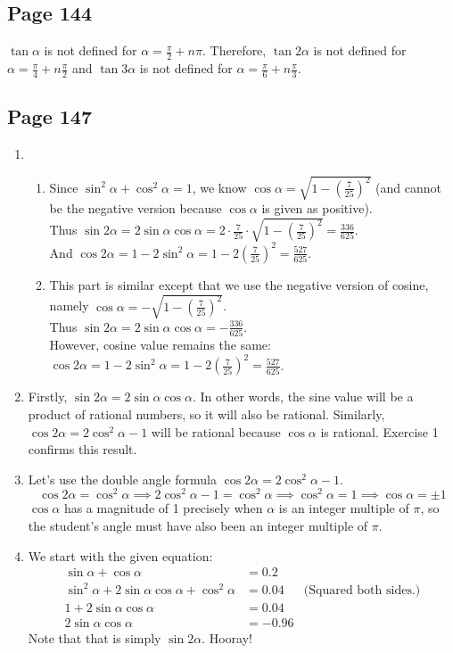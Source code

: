\documentclass{article}
\newenvironment{solutions}[1]
{\subsection*{#1}
 \begin{enumerate}[leftmargin=1.5em]}
{\end{enumerate}}
\newcommand{\solution}{\item}
\newenvironment{subsolutions}
{\begin{enumerate}}
{\end{enumerate}}
\begin{document}
\begin{solutions}{Page 144}
$\tan{\alpha}$ is not defined for $\alpha = \tfrac{\pi}{2} + n\pi$. Therefore, $\tan{2\alpha}$ is not defined for $\alpha = \tfrac{\pi}{4} + n\tfrac{\pi}{2}$ and $\tan{3\alpha}$ is not defined for $\alpha = \tfrac{\pi}{6} + n\tfrac{\pi}{3}$.
\end{solutions}

\begin{solutions}{Page 147}
\solution %
    \begin{subsolutions}
        \solution %
        Since $\sin^2 \alpha + \cos^2\alpha = 1$, we know $\cos\alpha = \sqrt{1-(\frac{7}{25})^2}$ (and cannot be the negative version because $\cos \alpha$ is given as positive).\\
        Thus $\sin 2\alpha = 2\sin\alpha \cos \alpha = 2\cdot \frac{7}{25}\cdot\sqrt{1-(\frac{7}{25})^2}=\frac{336}{625}$.\\
        And $\cos2\alpha =1-2\sin^2\alpha = 1-2(\frac{7}{25})^2=\frac{527}{625}$.
        \solution %
        This part is similar except that we use the negative version of cosine, namely $\cos\alpha=-\sqrt{1-(\frac{7}{25})^2}$.\\
        Thus $\sin 2\alpha = 2\sin\alpha \cos \alpha = -\frac{336}{625}$.\\
        However, cosine value remains the same: $\cos2\alpha =1-2\sin^2\alpha = 1-2(\frac{7}{25})^2=\frac{527}{625}$.
    \end{subsolutions}

\solution %
Firstly, $\sin 2\alpha=2\sin\alpha\cos\alpha$. In other words, the sine value will be a product of rational numbers, so it will also be rational. Similarly, $\cos 2\alpha=2\cos ^2 \alpha - 1$ will be rational because $\cos\alpha$ is rational. Exercise 1 confirms this result.

\solution %
Let's use the double angle formula $\cos 2\alpha=2\cos^2\alpha -1$.
\[
\cos{2\alpha} = \cos^{2}{\alpha} \implies 2\cos^{2}{\alpha}-1 = \cos^{2}{\alpha}  \implies \cos^{2}{\alpha} = 1 \implies \cos{\alpha} = \pm 1
\]
$\cos{\alpha}$ has a magnitude of 1 precisely when $\alpha$ is an integer multiple of $\pi$, so the student's angle must have also been an integer multiple of $\pi$.

\solution %
We start with the given equation:
\begin{align*}
    \sin{\alpha}+\cos{\alpha} &= 0.2\\
    \sin^{2}{\alpha}+2\sin{\alpha}\cos{\alpha+}\cos^2\alpha&=0.04 &\text{(Squared both sides.)}\\
    1+2\sin{\alpha}\cos{\alpha}&=0.04\\
    2\sin{\alpha}\cos{\alpha} &=-0.96
\end{align*}
Note that that is simply $\sin 2\alpha$. Hooray!


\end{solutions}
\end{document}
